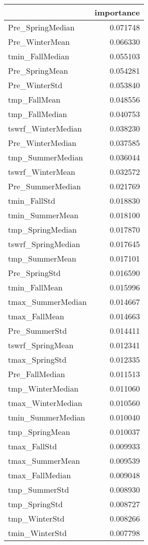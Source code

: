 \begin{tabular}{lr}
\toprule
 & importance \\
\midrule
Pre_SpringMedian & 0.071748 \\
Pre_WinterMean & 0.066330 \\
tmin_FallMedian & 0.055103 \\
Pre_SpringMean & 0.054281 \\
Pre_WinterStd & 0.053840 \\
tmp_FallMean & 0.048556 \\
tmp_FallMedian & 0.040753 \\
tswrf_WinterMedian & 0.038230 \\
Pre_WinterMedian & 0.037585 \\
tmp_SummerMedian & 0.036044 \\
tswrf_WinterMean & 0.032572 \\
Pre_SummerMedian & 0.021769 \\
tmin_FallStd & 0.018830 \\
tmin_SummerMean & 0.018100 \\
tmp_SpringMedian & 0.017870 \\
tswrf_SpringMedian & 0.017645 \\
tmp_SummerMean & 0.017101 \\
Pre_SpringStd & 0.016590 \\
tmin_FallMean & 0.015996 \\
tmax_SummerMedian & 0.014667 \\
tmax_FallMean & 0.014663 \\
Pre_SummerStd & 0.014411 \\
tswrf_SpringMean & 0.012341 \\
tmax_SpringStd & 0.012335 \\
Pre_FallMedian & 0.011513 \\
tmp_WinterMedian & 0.011060 \\
tmax_WinterMedian & 0.010560 \\
tmin_SummerMedian & 0.010040 \\
tmp_SpringMean & 0.010037 \\
tmax_FallStd & 0.009933 \\
tmax_SummerMean & 0.009539 \\
tmax_FallMedian & 0.009048 \\
tmp_SummerStd & 0.008930 \\
tmp_SpringStd & 0.008727 \\
tmp_WinterStd & 0.008266 \\
tmin_WinterStd & 0.007798 \\

\end{tabular}
